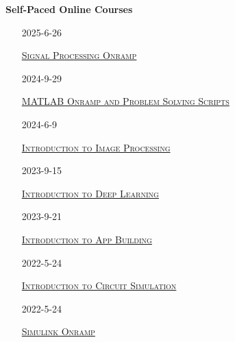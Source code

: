\documentclass[10pt,a4paper,oneside]{article}
\newlength{\datewidth}
\newlength{\textindent}
\begin{document}
\vspace{5mm}
\textbf{\hspace{\textindent}Self-Paced Online Courses}
\begin{itemize}
	\item[\hspace{\datewidth}\scriptsize 2025-6-26] \parbox[t]{\dimexpr\linewidth-\datewidth-\textindent}{\href{https://matlabacademy.mathworks.com/progress/share/certificate.html?id=8d446314-2eac-4c3c-9809-fff2192233a2&}{\textsc{Signal Processing Onramp}}}
	
	\item[\hspace{\datewidth}\scriptsize 2024-9-29] \parbox[t]{\dimexpr\linewidth-\datewidth-\textindent}{\href{https://matlabacademy.mathworks.com/progress/share/certificate.html?id=ae2e7096-91ff-4827-8c07-6885827ff584&}{\textsc{MATLAB Onramp and Problem Solving Scripts}}}
	
	\item[\hspace{\datewidth}\scriptsize 2024-6-9] \parbox[t]{\dimexpr\linewidth-\datewidth-\textindent}{\href{https://matlabacademy.mathworks.com/progress/share/report.html?id=c9b24992-b614-48d2-a06f-0546c9d9d412&}{\textsc{Introduction to Image Processing}}}
	
	\item[\hspace{\datewidth}\scriptsize 2023-9-15] \parbox[t]{\dimexpr\linewidth-\datewidth-\textindent}{\href{https://matlabacademy.mathworks.com/progress/share/report.html?id=a773357e-1315-4d27-8bdc-ff2af04983a1&}{\textsc{Introduction to Deep Learning}}}
	
	\item[\hspace{\datewidth}\scriptsize 2023-9-21] \parbox[t]{\dimexpr\linewidth-\datewidth-\textindent}{\href{https://matlabacademy.mathworks.com/progress/share/report.html?id=8db10b82-5beb-4543-87c7-c8e13c5f7ccf&}{\textsc{Introduction to App Building}}}
	
	\item[\hspace{\datewidth}\scriptsize 2022-5-24] \parbox[t]{\dimexpr\linewidth-\datewidth-\textindent}{\href{https://matlabacademy.mathworks.com/progress/share/report.html?id=8e8b78c7-bd81-496c-b869-37bb71db1a39&}{\textsc{Introduction to Circuit Simulation}}}
	
	\item[\hspace{\datewidth}\scriptsize 2022-5-24] \parbox[t]{\dimexpr\linewidth-\datewidth-\textindent}{\href{https://matlabacademy.mathworks.com/progress/share/report.html?id=9a64293c-a2bd-48b0-b613-dc2d2b0ed99d&}{\textsc{Simulink Onramp}}}
\end{itemize}
	
\end{document}
